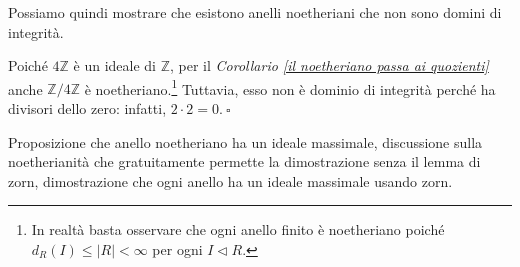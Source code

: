 \noindent Possiamo quindi mostrare che esistono anelli noetheriani che non sono domini di integrità.

\begin{exm}
  Poiché $4\mathbb{Z}$ è un ideale di $\mathbb{Z}$, per il \emph{Corollario \ref{il noetheriano passa ai quozienti}} 
  anche $\mathbb{Z}/4\mathbb{Z}$ è noetheriano.\footnote{In realtà basta osservare che ogni anello finito è noetheriano 
  poiché $d_R(I)\leq |R|<\infty$ per ogni $I\lhd R$.} 
  Tuttavia, esso non è dominio di integrità perché ha divisori dello zero: infatti, $2\cdot 2=0. \ \square$
\end{exm}

\clearpage

\noindent Proposizione che anello noetheriano ha un ideale massimale, discussione sulla noetherianità che gratuitamente 
permette la dimostrazione senza il lemma di zorn, dimostrazione che ogni anello ha un ideale massimale usando zorn.

